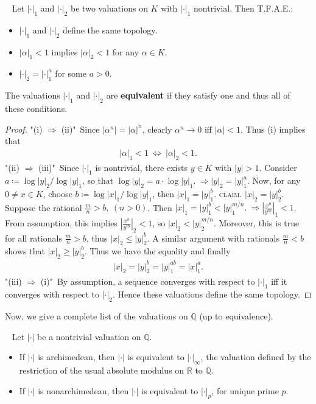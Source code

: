 \documentclass[12pt,a4paper,footinclude=true,headinclude=true]{scrbook} %
\newenvironment{theorem}[2][]
{\renewcommand\theinnercustomthm{#2}\innercustomthm[#1]
\begin{mdframed}[backgroundcolor=yellow!20]\ }
{\end{mdframed}\endinnercustomthm}
\newenvironment{proposition}[2][]
{\renewcommand\theinnercustomprop{#2}\innercustomprop[#1] 
\begin{mdframed}[backgroundcolor=gray!20]\ }
{\end{mdframed}\endinnercustomprop}
\begin{document}
\begin{proposition}{251. (Equivalent Valuations)}
    \newline Let $|\cdot|_1$ and $|\cdot|_2$ be two valuations on $K$ with $|\cdot|_1$ nontrivial. Then T.F.A.E.:
    \begin{itemize}
        \item[(i)] $|\cdot|_1$ and $|\cdot|_2$ define the same topology.
        \item[(ii)] $|\alpha|_1<1$ implies $|\alpha|_2<1$ for any $\alpha\in K$.
        \item[(iii)] $|\cdot|_2=|\cdot|_1^a$ for some $a>0$.
    \end{itemize}
    The valuations $|\cdot|_1$ and $|\cdot|_2$ are \textbf{equivalent} if they satisfy one and thus all of these conditions.
\end{proposition}
\begin{proof}
    "(i) $\Rightarrow$ (ii)"\ Since $|\alpha^n|=|\alpha|^n$, clearly $\alpha^n\to0$ iff $|\alpha|<1$. Thus (i) implies that
    \begin{align*}
        |\alpha|_1<1\ \Longleftrightarrow\ |\alpha|_2<1.
    \end{align*}
    "(ii) $\Rightarrow$ (iii)"\ Since $|\cdot|_1$ is nontrivial, there exists $y\in K$ with $|y|>1$. Consider\\ $a\coloneqq\log|y|_2/\log|y|_1$, so that $\log|y|_2=a\cdot\log|y|_1.\ \Rightarrow |y|_2=|y|_1^a$. Now, for any $0\neq x\in K$, choose $b\coloneqq\log|x|_1/\log|y|_1$, then $|x|_1=|y|_1^b$. \textsc{claim.} $|x|_2=|y|_2^b$.\\
    Suppose the rational $\frac{m}{n}>b,\ (n>0)$. Then $|x|_1=|y|_1^b<|y|_1^{m/n}.\ \Rightarrow |\frac{x^n}{y^m}|_1<1$. From assumption, this implies $|\frac{x^n}{y^m}|_2<1$, so $|x|_2<|y|_2^{m/n}$. Moreover, this is true for all rationals $\frac{m}{n}>b$, thus $|x|_2\leq|y|_2^b$. A similar argument with rationals $\frac{m}{n}<b$ shows that $|x|_2\geq|y|_2^b$. Thus we have the equality and finally
    \begin{align*}
        |x|_2=|y|_2^b=|y|_1^{ab}=|x|_1^a.
    \end{align*}
    "(iii) $\Rightarrow$ (i)"\ By assumption, a sequence converges with respect to  $|\cdot|_1$ iff it converges with respect to $|\cdot|_2$. Hence these valuations define the same topology.
\end{proof}
\newpage
Now, we give a complete list of the valuations on $\mathbb{Q}$ (up to equivalence).
\begin{theorem}{252. (Ostrowski)}
    Let $|\cdot|$ be a nontrivial valuation on $\mathbb{Q}$.
    \begin{itemize}
        \item[(a)] If $|\cdot|$ is archimedean, then $|\cdot|$ is equivalent to $|\cdot|_\infty$, the valuation defined by the restriction of the usual absolute modulus on $\mathbb{R}$ to $\mathbb{Q}$.
        \item[(b)] If $|\cdot|$ is nonarchimedean, then $|\cdot|$ is equivalent to $|\cdot|_p$, for unique prime $p$.
    \end{itemize}
\end{theorem}
\end{document}
